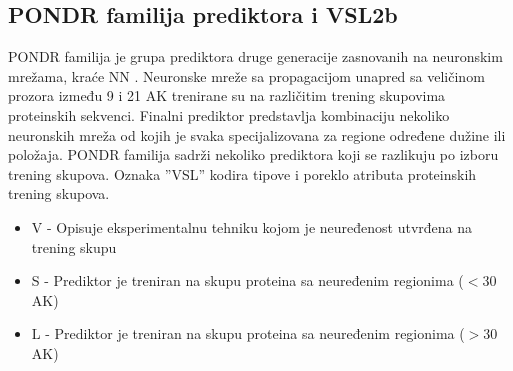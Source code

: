 %
%
%
%
%


\subsection{PONDR familija prediktora i VSL2b}
\label{VSL2b}

PONDR familija  je grupa
prediktora druge generacije zasnovanih na neuronskim mrežama, kraće NN .
Neuronske mreže sa propagacijom unapred  sa veličinom
prozora između 9 i 21 AK trenirane su na različitim trening skupovima
proteinskih sekvenci.  Finalni prediktor predstavlja kombinaciju nekoliko
neuronskih mreža od kojih je svaka specijalizovana za regione određene dužine
ili položaja.  PONDR familija sadrži nekoliko prediktora koji  se razlikuju 
po izboru trening skupova.
Oznaka ''VSL'' kodira tipove i poreklo atributa proteinskih trening skupova.
\begin{itemize}
  \item V - Opisuje eksperimentalnu tehniku kojom je neuređenost utvrđena na
    trening skupu 
  \item S - Prediktor je treniran na skupu proteina sa 
      neuređenim regionima ($<30$ AK)
  \item L - Prediktor je treniran na skupu proteina sa 
    neuređenim regionima ($>30$ AK)
\end{itemize}


